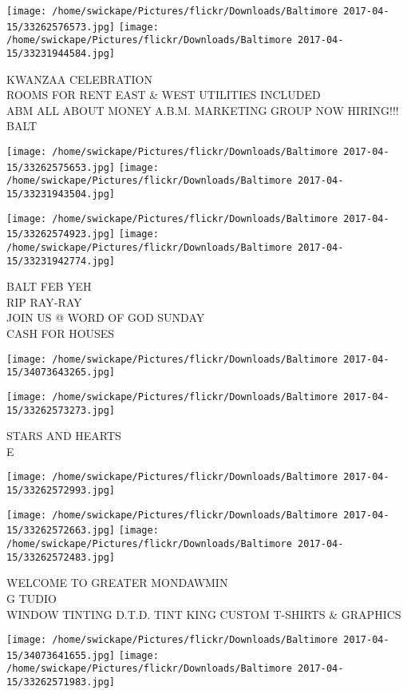 \documentclass[10pt,letterpaper]{article}
\begin{document}
\texttt{[image: /home/swickape/Pictures/flickr/Downloads/Baltimore 2017-04-15/33262576573.jpg]}
\texttt{[image: /home/swickape/Pictures/flickr/Downloads/Baltimore 2017-04-15/33231944584.jpg]}

KWANZAA CELEBRATION\\
ROOMS FOR RENT EAST \& WEST UTILITIES INCLUDED\\
ABM ALL ABOUT MONEY A.B.M. MARKETING GROUP NOW HIRING!!!\\
BALT
\pagebreak

\texttt{[image: /home/swickape/Pictures/flickr/Downloads/Baltimore 2017-04-15/33262575653.jpg]}
\texttt{[image: /home/swickape/Pictures/flickr/Downloads/Baltimore 2017-04-15/33231943504.jpg]}

\texttt{[image: /home/swickape/Pictures/flickr/Downloads/Baltimore 2017-04-15/33262574923.jpg]}
\texttt{[image: /home/swickape/Pictures/flickr/Downloads/Baltimore 2017-04-15/33231942774.jpg]}

BALT FEB YEH\\
RIP RAY{-}RAY\\
JOIN US @ WORD OF GOD SUNDAY\\
CASH FOR HOUSES
\pagebreak

\texttt{[image: /home/swickape/Pictures/flickr/Downloads/Baltimore 2017-04-15/34073643265.jpg]}

\vspace{0.25in}
\texttt{[image: /home/swickape/Pictures/flickr/Downloads/Baltimore 2017-04-15/33262573273.jpg]}

STARS AND HEARTS\\
E
\pagebreak

\texttt{[image: /home/swickape/Pictures/flickr/Downloads/Baltimore 2017-04-15/33262572993.jpg]}

\vspace{0.25in}
\texttt{[image: /home/swickape/Pictures/flickr/Downloads/Baltimore 2017-04-15/33262572663.jpg]}
\texttt{[image: /home/swickape/Pictures/flickr/Downloads/Baltimore 2017-04-15/33262572483.jpg]}

WELCOME TO GREATER MONDAWMIN\\
G TUDIO\\
WINDOW TINTING D.T.D. TINT KING CUSTOM T{-}SHIRTS \& GRAPHICS
\pagebreak

\texttt{[image: /home/swickape/Pictures/flickr/Downloads/Baltimore 2017-04-15/34073641655.jpg]}
\texttt{[image: /home/swickape/Pictures/flickr/Downloads/Baltimore 2017-04-15/33262571983.jpg]}
\end{document}
